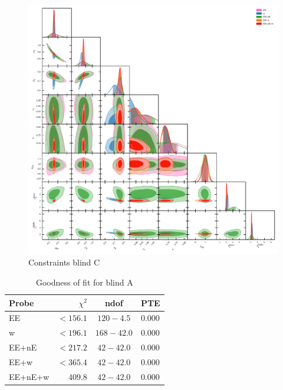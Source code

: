 \begin{figure}
	\begin{center}
		\includegraphics[width=\textwidth]{Parameter_Plots/omegam_sigma8_s8_ns_h_a_ia_b1l_b1h_blind_C}
		\caption{Constraints blind C}
		\label{fig:cosmology-params}
	\end{center}
\end{figure}

\begin{table}
	\begin{center}
		\caption{Goodness of fit for blind A}
		\label{tab:goodness-of-fit}
\begin{tabular}{lrcl}
    \toprule
    Probe             & $\chi^2$       & ndof       & PTE   \\
    \midrule
	EE               & $< 156.1$ & $120-4.5$ & 0.000 \\
	w                & $< 196.1$ & $168-42.0$ & 0.000 \\
	EE+nE            & $< 217.2$ & $ 42-42.0$ & 0.000 \\
	EE+w             & $< 365.4$ & $ 42-42.0$ & 0.000 \\
	EE+nE+w          & $409.8$ & $ 42-42.0$ & 0.000 \\
    \bottomrule
\end{tabular}
	\end{center}
\end{table}

